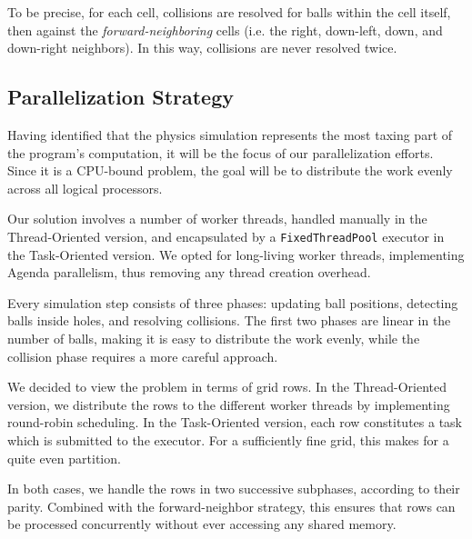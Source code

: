 \documentclass{scrartcl}
\begin{document}
To be precise, for each cell, collisions are resolved for balls within the cell itself, then against the \textit{forward-neighboring} cells (i.e. the right, down-left, down, and down-right neighbors). In this way, collisions are never resolved twice.

\subsection{Parallelization Strategy}
Having identified that the physics simulation represents the most taxing part of the program's computation, it will be the focus of our parallelization efforts. Since it is a CPU-bound problem, the goal will be to distribute the work evenly across all logical processors.

Our solution involves a number of worker threads, handled manually in the Thread-Oriented version, and encapsulated by a \texttt{FixedThreadPool} executor in the Task-Oriented version. We opted for long-living worker threads, implementing Agenda parallelism, thus removing any thread creation overhead.

Every simulation step consists of three phases: updating ball positions, detecting balls inside holes, and resolving collisions. The first two phases are linear in the number of balls, making it is easy to distribute the work evenly, while the collision phase requires a more careful approach.

We decided to view the problem in terms of grid rows. In the Thread-Oriented version, we distribute the rows to the different worker threads by implementing round-robin scheduling. In the Task-Oriented version, each row constitutes a task which is submitted to the executor. For a sufficiently fine grid, this makes for a quite even partition.

In both cases, we handle the rows in two successive subphases, according to their parity. Combined with the forward-neighbor strategy, this ensures that rows can be processed concurrently without ever accessing any shared memory.
%
\end{document}
